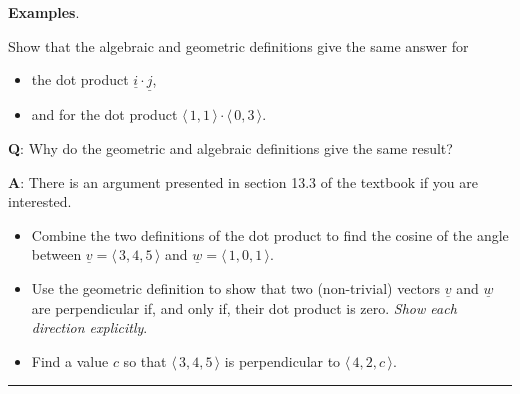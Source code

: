 \documentclass[12pt,letterpaper,noanswers]{exam}
\newcommand{\mb}[1]{\underline{#1}}
\begin{document}
\noindent\textbf{Examples}.

Show that the algebraic and geometric definitions give the same answer for 
\begin{itemize}
    \item the dot product $\mb{i} \cdot \mb{j}$,
    \vspace{1cm}
    
    \item and for the dot product $\langle\, 1, 1\,\rangle \cdot \langle\, 0, 3 \,\rangle$.
    \vspace{1cm}
    
    \vspace{2cm}
\end{itemize} 

\noindent \textbf{Q}: Why do the geometric and algebraic definitions give the same result?  

\noindent\textbf{A}: There is an argument presented in section 13.3 of the textbook if you are interested.  


\begin{itemize}
    \item Combine the two definitions of the dot product to find the cosine of the angle between $\mb{v} = \langle\, 3,4,5\,\rangle$ and $\mb{w} = \langle\, 1,0,1 \,\rangle$.
    \vspace{2cm}
    
    \item Use the geometric definition to show that two (non-trivial) vectors $\mb{v}$ and $\mb{w}$ are perpendicular if, and only if, their dot product is zero.  \emph{Show each direction explicitly}.
    \vspace{3cm}
    
    \item Find a value $c$ so that $\langle\, 3,4,5 \,\rangle$ is perpendicular to $\langle\, 4, 2, c \,\rangle$.
    \vspace{2cm}
\end{itemize}

\vspace{0.2cm}
\hrule
\vspace{0.2cm}
\end{document}
